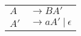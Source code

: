 \documentclass[convert={density=300,size=1080x800,outext=.png}]{standalone}
\begin{document}
\begin{tabular}{l@{ }l}
  $ A $ & $ \rightarrow BA' $ \\
  $ A' $ & $ \rightarrow aA' \ | \ \epsilon $ \\
\end{tabular}
\end{document}
